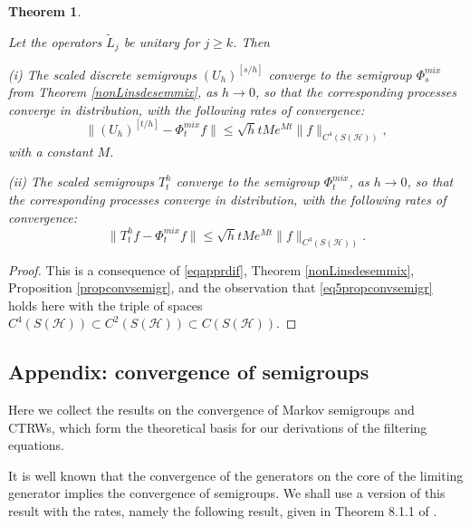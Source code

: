 \documentclass[10pt,a4paper]{amsart}
\def\HC{\mathcal{H}}
\newtheorem{theorem}{Theorem}[section]
\begin{document}
\begin{theorem}
\label{thBeleqdif}

Let the operators $\tilde L_j$ be unitary for $j\ge k$. Then

(i) The scaled discrete semigroups $(U_h)^{[s/h]}$ converge to the semigroup $\Phi^{mix}_s$
from Theorem \ref{nonLinsdesemmix},
as $h\to 0$, so that the corresponding
processes converge in distribution,
 with the following rates of convergence:
\begin{equation}
\label{eq1thBeleqdif}
\|(U_h)^{[t/h]} -\Phi^{mix}_tf\| \le \sqrt h t M e^{Mt} \|f\|_{C^4(S(\HC))},
\end{equation}
with a constant $M$.

(ii) The scaled semigroups $T_t^h$ converge to the semigroup $\Phi^{mix}_t$,
as $h\to 0$, so that the corresponding
processes converge in distribution, with the following rates of convergence:
\begin{equation}
\label{eq2thBeleqdif}
\|T_t^hf -\Phi_t^{mix}f\| \le \sqrt h t M e^{Mt} \|f\|_{C^3(S(\HC))}.
\end{equation}
\end{theorem}

\begin{proof}
This is a consequence of \eqref{eqapprdif}, Theorem \ref{nonLinsdesemmix},
Proposition \ref{propconvsemigr}, and the observation that \eqref{eq5propconvsemigr}
holds here with  the triple of spaces $C^4(S(\HC))\subset C^2(S(\HC)) \subset C(S(\HC))$.
\end{proof}

\subsection{Appendix: convergence of semigroups}
\label{appsem}

Here we collect the results on the convergence of Markov semigroups and CTRWs, which form
the theoretical basis for our derivations of the filtering equations.

It is well known that the convergence of the generators on the core of the limiting generator
implies the convergence of semigroups. We shall use a version of this result with the rates,
namely the following result, given in Theorem 8.1.1 of \cite{Kolbook11}.
\end{document}
